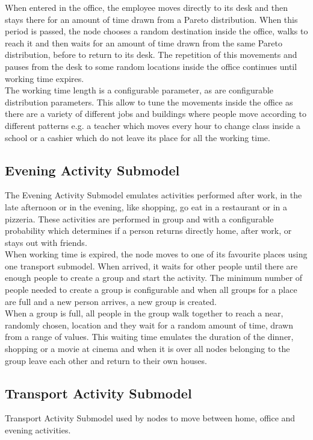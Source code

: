 When entered in the office, the employee moves directly to its desk and then stays there for an amount of time drawn from a Pareto distribution. When this period is passed, the node chooses a random destination inside the office, walks to reach it and then waits for an amount of time drawn from the same Pareto distribution, before to return to its desk. The repetition of this movements and pauses from the desk to some random locations inside the office continues until working time expires. 
\\

The working time length is a configurable parameter, as are configurable distribution parameters. This allow to tune the movements inside the office as there are a variety of different jobs and buildings where people move according to different patterns e.g. a teacher which moves every hour to change class inside a school or a cashier which do not leave its place for all the working time.


\subsection{Evening Activity Submodel}
The Evening Activity Submodel emulates activities performed after work, in the late afternoon or in the evening, like shopping, go eat in a restaurant or in a pizzeria. These activities are performed in group and with a configurable probability which determines if a person returns directly home, after work, or stays out with friends.
\\

When working time is expired, the node moves to one of its favourite places using one transport submodel. When arrived, it waits for other people until there are enough people to create a group and start the activity. The minimum number of people needed to create a group is configurable and when all groups for a place are full and a new person arrives, a new group is created.
\\

When a group is full, all people in the group walk together to reach a near, randomly chosen, location and they wait for a random amount of time, drawn from a range of values. This waiting time emulates the duration of the dinner, shopping or a movie at cinema and when it is over all nodes belonging to the group leave each other and return to their own houses.

\subsection{Transport Activity Submodel}
Transport Activity Submodel used by nodes to move between home, office and evening activities.
\\

